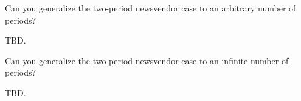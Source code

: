 \begin{question}
\end{question}

\begin{question}
Can you generalize the two-period newsvendor case to an arbitrary number of periods?
   \begin{solution}
     TBD.
   \end{solution}
\end{question}

\begin{question}
Can you generalize the two-period newsvendor case to an infinite number of periods?
   \begin{solution}
     TBD.
   \end{solution}
\end{question}


